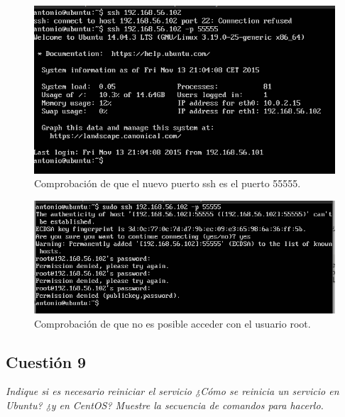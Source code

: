 \begin{figure}[H]
    \begin{center}
        \includegraphics[scale=0.6]{imagenes/img6}
        \caption{Comprobación de que el nuevo puerto ssh es el puerto 55555.}
        \label{fig7}
    \end{center}
\end{figure}

\begin{figure}[H]
    \begin{center}
        \includegraphics[scale=0.6]{imagenes/img8}
        \caption{Comprobación de que no es posible acceder con el usuario root.}
        \label{fig8}
    \end{center}
\end{figure}






\subsection{Cuestión 9}
\textit{Indique si es necesario reiniciar el servicio ¿Cómo se reinicia un servicio en Ubuntu? ¿y en CentOS? Muestre la secuencia de comandos para hacerlo.}
\newline

